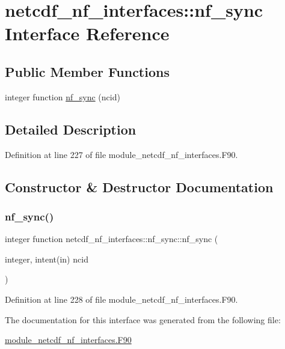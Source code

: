 \hypertarget{interfacenetcdf__nf__interfaces_1_1nf__sync}{}\section{netcdf\+\_\+nf\+\_\+interfaces\+:\+:nf\+\_\+sync Interface Reference}
\label{interfacenetcdf__nf__interfaces_1_1nf__sync}
\subsection*{Public Member Functions}
\begin{DoxyCompactItemize}
\item 
integer function \hyperlink{interfacenetcdf__nf__interfaces_1_1nf__sync_af235499977a26cead3f906880f2357ef}{nf\+\_\+sync} (ncid)
\end{DoxyCompactItemize}


\subsection{Detailed Description}


Definition at line 227 of file module\+\_\+netcdf\+\_\+nf\+\_\+interfaces.\+F90.



\subsection{Constructor \& Destructor Documentation}
\mbox{\label{interfacenetcdf__nf__interfaces_1_1nf__sync_af235499977a26cead3f906880f2357ef}} 
\subsubsection{\texorpdfstring{nf\+\_\+sync()}{nf\_sync()}}
{\footnotesize\ttfamily integer function netcdf\+\_\+nf\+\_\+interfaces\+::nf\+\_\+sync\+::nf\+\_\+sync (\begin{DoxyParamCaption}\item[{integer, intent(in)}]{ncid }\end{DoxyParamCaption})}



Definition at line 228 of file module\+\_\+netcdf\+\_\+nf\+\_\+interfaces.\+F90.



The documentation for this interface was generated from the following file\+:\begin{DoxyCompactItemize}
\item 
\hyperlink{module__netcdf__nf__interfaces_8F90}{module\+\_\+netcdf\+\_\+nf\+\_\+interfaces.\+F90}\end{DoxyCompactItemize}
